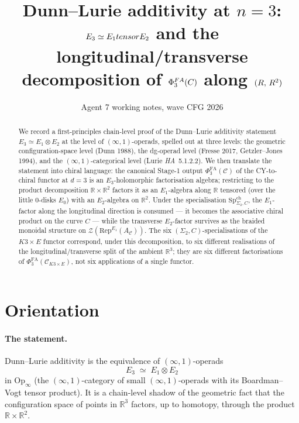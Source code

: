 \documentclass[11pt]{article}
\title{Dunn--Lurie additivity at $n = 3$: \\
  $\Ethree \simeq \Eone \otimes \Etwo$ and the longitudinal/transverse \\
  decomposition of $\PhiFA_{3}(\cC)$ along $(\R,\,\R^{2})$}
\author{Agent 7 working notes, wave CFG 2026}
\date{}
\newcommand{\Eone}{E_{1}}
\newcommand{\Etwo}{E_{2}}
\newcommand{\Ethree}{E_{3}}
\newcommand{\R}{\mathbb{R}}
\newcommand{\PhiFA}{\Phi^{\mathrm{FA}}}
\newcommand{\SpCh}{\mathrm{Sp}^{\mathrm{ch}}}
\newcommand{\cC}{\mathcal{C}}
\newcommand{\cZ}{\mathcal{Z}}
\newcommand{\Rep}{\mathrm{Rep}}
\begin{document}
\maketitle

\begin{abstract}
  We record a first-principles chain-level proof of the Dunn--Lurie
  additivity statement $\Ethree \simeq \Eone \otimes \Etwo$ at the level
  of $(\infty, 1)$-operads, spelled out at three levels: the
  geometric configuration-space level (Dunn 1988), the dg-operad level
  (Fresse 2017, Getzler--Jones 1994), and the $(\infty, 1)$-categorical
  level (Lurie \emph{HA}~5.1.2.2). We then translate the statement into
  chiral language: the canonical Stage-1 output
  $\PhiFA_{3}(\cC)$ of the CY-to-chiral functor at $d = 3$ is an
  $\Ethree$-holomorphic factorisation algebra; restricting to the
  product decomposition $\R \times \R^{2}$ factors it as an
  $\Eone$-algebra along $\R$ tensored (over the little $0$-disks $E_{0}$)
  with an $\Etwo$-algebra on $\R^{2}$. Under the specialisation
  $\SpCh_{\Sigma_{2}, C}$, the $\Eone$-factor along the longitudinal
  direction is consumed --- it becomes the associative chiral product on
  the curve $C$ --- while the transverse $\Etwo$-factor survives as the
  braided monoidal structure on $\cZ(\Rep^{\Eone}(A_{\cC}))$. The six
  $(\Sigma_{2}, C)$-specialisations of the $K3 \times E$ functor
  correspond, under this decomposition, to six different realisations of
  the longitudinal/transverse split of the ambient $\R^{3}$; they are
  six different factorisations of $\PhiFA_{3}(\cC_{K3 \times E})$, not
  six applications of a single functor.
\end{abstract}

\section{Orientation}
\label{sec:orientation}

\paragraph{The statement.}
Dunn--Lurie additivity is the equivalence of $(\infty, 1)$-operads
\[
  \boxed{\;\Ethree \;\simeq\; \Eone \otimes \Etwo\;}
\]
in $\mathrm{Op}_{\infty}$ (the $(\infty, 1)$-category of small
$(\infty, 1)$-operads with its Boardman--Vogt tensor product). It is a
chain-level shadow of the geometric fact that the configuration space
of points in $\R^{3}$ factors, up to homotopy, through the product
$\R \times \R^{2}$.
\end{document}
